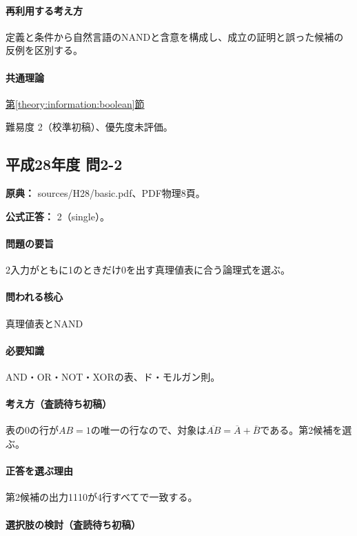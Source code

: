 \paragraph{再利用する考え方} 定義と条件から自然言語のNANDと含意を構成し、成立の証明と誤った候補の反例を区別する。

\paragraph{共通理論} \hyperref[theory:information:boolean]{第\ref*{theory:information:boolean}節}

\par 難易度 2（校準初稿）、優先度未評価。

\subsection{平成28年度 問2-2}
\label{q:h28-reg-basic-2-2}

\noindent\textbf{原典：} sources/H28/basic.pdf、PDF物理8頁。

\textbf{公式正答：} 2（single）。

\paragraph{問題の要旨} 2入力がともに1のときだけ0を出す真理値表に合う論理式を選ぶ。

\paragraph{問われる核心} 真理値表とNAND

\paragraph{必要知識} AND・OR・NOT・XORの表、ド・モルガン則。

\paragraph{考え方（査読待ち初稿）} 表の0の行が\(AB=1\)の唯一の行なので、対象は\(\overline{AB}=\overline A+\overline B\)である。第2候補を選ぶ。

\paragraph{正答を選ぶ理由} 第2候補の出力1110が4行すべてで一致する。

\paragraph{選択肢の検討（査読待ち初稿）}\mbox{}\par

